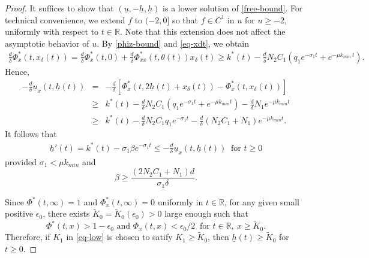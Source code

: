 \documentclass[11pt]{amsart}
\numberwithin{equation}{section}
\begin{document}
  \begin{proof} It suffices to show that $(\underline{u},-\underline{h},\underline{h})$ is  a lower solution of \eqref{free-bound}. For technical convenience, we extend $f$ to   $(-2,0]$ so  that $f\in C^1$ in $u$ for $u\geq -2$, uniformly with respect to $t\in \mathbb R$. Note that this extension does not affect the asymptotic behavior of $u$. By \eqref{phiz-bound} and \eqref{eq-xdt}, we obtain 
\begin{eqnarray*}
  \frac{d}{\delta}\Phi^*_x(t,x_\delta(t))=   \frac{d}{\delta}\Phi^*_x(t,0)+  \frac{d}{\delta}\Phi^*_{xx}(t,\theta(t))x_\delta(t)\geq k^*(t)-\frac{d}{\delta}N_2C_1 (q_1e^{-\sigma_1t}+ e^{-\mu  k_{min}\,t}).
\end{eqnarray*}
Hence,
\begin{eqnarray*}
  -\frac{d}{\delta}\underline{u}_x(t,\underline{h}(t))&=&-\frac{d}{\delta}\left[\Phi^*_x(t,2\underline{h}(t)+x_\delta(t))-\Phi^*_x(t,x_\delta(t))\right]\\
  &\geq& k^*(t)-\frac{d}{\delta}N_2C_1 (q_1e^{-\sigma_1t}+ e^{-\mu  k_{min}t})-\frac{d}{\delta}N_1 e^{-\mu  k_{min}t}\\
  &\geq &k^*(t)- \frac{d}{\delta}N_2C_1q_1 e^{-\sigma_1t}-\frac{d}{\delta}(N_2C_1+N_1) e^{-\mu  k_{min}t}.
\end{eqnarray*}
It follows that 
\begin{eqnarray*}
  \underline{h}'(t)=k^*(t)-\sigma_1\beta e^{-\sigma_1t}\leq   -\frac{d}{\delta}\underline{u}_x(t,\underline{h}(t)) ~\text{ for }t\geq 0
\end{eqnarray*}
provided $\sigma_1<\mu  k_{min}$ and 
\begin{equation*}
  \beta\geq \frac{(2N_2C_1+N_1)d}{\sigma_1\delta}.
\end{equation*} 


 Since  $\Phi^*(t,\infty)=1$ and $\Phi^*_x(t,\infty)=0$ uniformly in $t\in\mathbb{R}$, for any given  small positive $\epsilon_0$,  there exists  $\tilde{K}_0=\tilde{K}_0(\epsilon_0)>0$ large enough such that 
\begin{equation}\label{phi-epsi}
  \Phi^*(t,x)> 1-\epsilon_0 \text{ and }\Phi_x(t,x)<\epsilon_0/2~\text{ for }t\in\mathbb{R},\ x\geq  \tilde{K}_0.
\end{equation}
Therefore, if $K_1$ in \eqref{eq-low} is chosen to satify $K_1\geq \tilde{K}_0$, then   $\underline{h}(t)\geq \tilde{K}_0$ for $t\geq 0$.



\end{proof}
\end{document}
